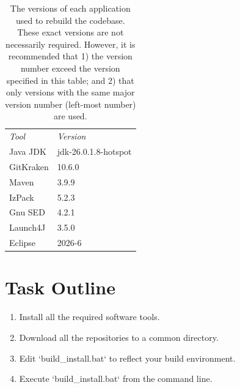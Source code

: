 \documentclass{article}
\begin{document}
\begin{table}[t]
    \centering
    \begin{tabular}{ll}
         \emph{Tool} & \emph{Version} \\
         Java JDK & jdk-26.0.1.8-hotspot \\
         GitKraken & 10.6.0 \\
         Maven & 3.9.9 \\
         IzPack & 5.2.3 \\
         Gnu SED & 4.2.1 \\
         Launch4J & 3.5.0 \\         
         Eclipse &  2026-6 \\
    \end{tabular}
    \caption{The versions of each application used to rebuild the codebase.  These exact versions are not necessarily required.  However, it is recommended that 1) the version number exceed the version specified in this table; and 2) that only versions with the same major version number (left-most number) are used.}
    \label{tab:versions}
\end{table}

\section{Task Outline}
\begin{enumerate}
    \item Install all the required software tools.
    \item Download all the repositories to a common directory.
    \item Edit `build\_install.bat` to reflect your build environment.
    \item Execute `build\_install.bat` from the command line.
\end{enumerate}
\end{document}
